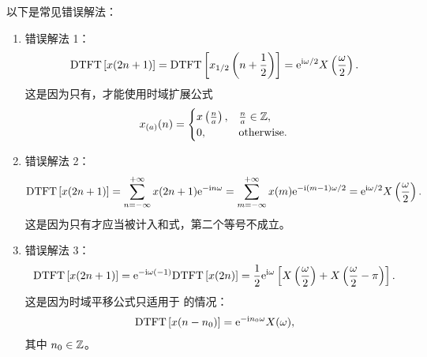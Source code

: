 \begin{note}
    以下是常见错误解法：
    \begin{enumerate}
        \item 错误解法 1：
            \begin{align*}
                \mathrm{DTFT}\left[x(2n + 1)\right] = \mathrm{DTFT}\left[x_{1/2}\left(n + \frac{1}{2}\right)\right] = \mathrm{e}^{\mathrm{i}\omega/2}X\left(\frac{\omega}{2}\right).
            \end{align*} 
            这是因为只有，才能使用时域扩展公式
            \begin{align*}
                x_{(a)}(n) = \begin{cases}
                    x\left(\frac{n}{a}\right), & \frac{n}{a} \in \mathbb{Z}, \\
                    0, & \text{otherwise}.
                \end{cases}
            \end{align*}
        \item 错误解法 2：
            \begin{align*}
                \mathrm{DTFT}\left[x(2n + 1)\right] = \sum_{n = -\infty}^{+\infty}x(2n + 1)\mathrm{e}^{-\mathrm{i} n\omega}
                    = \sum_{m = -\infty}^{+\infty}x(m)\mathrm{e}^{-\mathrm{i} (m - 1)\omega / 2}
                    = \mathrm{e}^{\mathrm{i}\omega/2}X\left(\frac{\omega}{2}\right).
            \end{align*}
            这是因为只有才应当被计入和式，第二个等号不成立。
        \item 错误解法 3：
            \begin{align*}
                \mathrm{DTFT}\left[x(2n + 1)\right] = \mathrm{e}^{-\mathrm{i}\omega(-1)}\mathrm{DTFT}\left[x(2n)\right]
                    = \frac{1}{2}\mathrm{e}^{\mathrm{i}\omega}\left[X\left(\frac{\omega}{2}\right)
                        + X\left(\frac{\omega}{2} - \pi\right)\right].
            \end{align*}
            这是因为时域平移公式只适用于 的情况：
            \begin{align*}
                \mathrm{DTFT}\left[x(n - n_0)\right] = \mathrm{e}^{-\mathrm{i} n_0\omega}X(\omega),
            \end{align*}
            其中 $n_0 \in \mathbb{Z}$。
    \end{enumerate}
\end{note}

